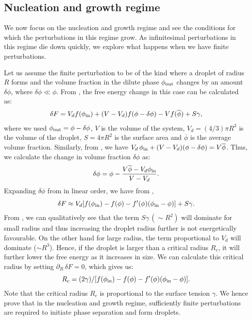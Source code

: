 \begin{appendices}
\section{Nucleation and growth regime}

We now focus on the nucleation and growth regime and see the conditions for which the perturbations in this regime grow.
As infinitesimal perturbations in this regime die down quickly, we explore what happens when we have finite perturbations.

Let us assume the finite perturbation to be of the kind where a droplet of radius $R$ forms and the volume fraction in the dilute phase $\phi_\mathrm{out}$ changes by an amount $\delta \phi$, where $\delta \phi \ll \phi$.
From , the free energy change in this case can be calculated as: 
\begin{equation}
\label{eqn:infinitesimal_change_0}
    \delta F = V_d f(\phi_\mathrm{in}) + (V - V_d) f(\phi - \delta \phi) - V f(\overline{\phi}) + S \gamma,
\end{equation}
where we used $\phi_\mathrm{out} = \phi - \delta \phi$, $V$ is the volume of the system, $V_d = (4/3) \pi R^3$ is the volume of the droplet, $S = 4 \pi R^2$ is the surface area and $\overline{\phi}$ is the average volume fraction. 
Similarly, from , we have $V_d \, \phi_\mathrm{in} + (V - V_d) (\phi - \delta \phi) = V \overline{\phi}$.
Thus, we calculate the change in volume fraction $\delta \phi$ as:
\begin{equation}
\label{eqn:infinitesimal_change_1}
    \delta \phi = \phi - \frac{V \overline{\phi} - V_d \phi_\mathrm{in}}{V - V_d}.
\end{equation}
Expanding $\delta \phi$ from  in linear order, we have from ,
\begin{equation}
\label{eqn:infinitesimal_change_2}
    \delta F \approx V_d [f(\phi_\mathrm{in}) - f(\phi) - f'(\phi)(\phi_\mathrm{in} - \phi)] + S \gamma.
\end{equation}
From , we can qualitatively see that the term $S \gamma \, (\sim R^2)$ will dominate for small radius and thus increasing the droplet radius further is not energetically favourable. 
On the other hand for large radius, the term proportional to $V_d$ will dominate ($\sim R^3$). 
Hence, if the droplet is larger than a critical radius $R_c$, it will further lower the free energy as it increases in size.
We can calculate this critical radius by setting $\partial_R\,\delta F = 0$, which gives us:
\begin{equation*}
    R_c = (2 \gamma) / [f(\phi_\mathrm{in}) - f(\phi) - f'(\phi)(\phi_\mathrm{in} - \phi)].
\end{equation*}
Note that the critical radius $R_c$ is proportional to the surface tension $\gamma$.
We hence prove that in the nucleation and growth regime, sufficiently finite perturbations are required to initiate phase separation and form droplets. 


\end{appendices}
